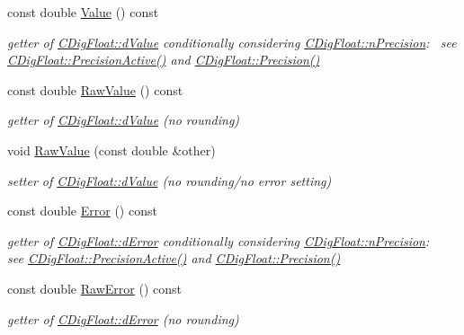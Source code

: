 \begin{DoxyCompactItemize}
const double \hyperlink{classCDigFloat_a308ccc3e3c96dd81977033e0a94344fd}{Value} () const
\begin{DoxyCompactList}\small\item\em getter of \hyperlink{classCDigFloat_a4bbe69e30dd4e20527362493aa9aaf96}{C\+Dig\+Float\+::d\+Value} conditionally considering \hyperlink{classCDigFloat_ad580654be35246d14c91482581c0bc11}{C\+Dig\+Float\+::n\+Precision}\+:~\newline
 see \hyperlink{classCDigFloat_a4d6ca24beda280be719374c2a6b2c64d}{C\+Dig\+Float\+::\+Precision\+Active()} and \hyperlink{classCDigFloat_a95875f6f7246debee0d00b0c41c82aee}{C\+Dig\+Float\+::\+Precision()} \end{DoxyCompactList}\item 
const double \hyperlink{classCDigFloat_ab6d3001a549d7496156321cbb26dde51}{Raw\+Value} () const
\begin{DoxyCompactList}\small\item\em getter of \hyperlink{classCDigFloat_a4bbe69e30dd4e20527362493aa9aaf96}{C\+Dig\+Float\+::d\+Value} (no rounding) \end{DoxyCompactList}\item 
void \hyperlink{classCDigFloat_a10dd39f19bfc21ae1d545d9203ef3e95}{Raw\+Value} (const double \&other)
\begin{DoxyCompactList}\small\item\em setter of \hyperlink{classCDigFloat_a4bbe69e30dd4e20527362493aa9aaf96}{C\+Dig\+Float\+::d\+Value} (no rounding/no error setting) \end{DoxyCompactList}\item 
const double \hyperlink{classCDigFloat_a1b067b1bde507408956fa65bef7368bb}{Error} () const
\begin{DoxyCompactList}\small\item\em getter of \hyperlink{classCDigFloat_a25eb3782d1e727ff007a48f8308e3d4d}{C\+Dig\+Float\+::d\+Error} conditionally considering \hyperlink{classCDigFloat_ad580654be35246d14c91482581c0bc11}{C\+Dig\+Float\+::n\+Precision}\+: ~\newline
 see \hyperlink{classCDigFloat_a4d6ca24beda280be719374c2a6b2c64d}{C\+Dig\+Float\+::\+Precision\+Active()} and \hyperlink{classCDigFloat_a95875f6f7246debee0d00b0c41c82aee}{C\+Dig\+Float\+::\+Precision()} \end{DoxyCompactList}\item 
const double \hyperlink{classCDigFloat_a9805530caa01cc722cfbe8912689daa7}{Raw\+Error} () const
\begin{DoxyCompactList}\small\item\em getter of \hyperlink{classCDigFloat_a25eb3782d1e727ff007a48f8308e3d4d}{C\+Dig\+Float\+::d\+Error} (no rounding) \end{DoxyCompactList}\item 

\end{DoxyCompactItemize}
